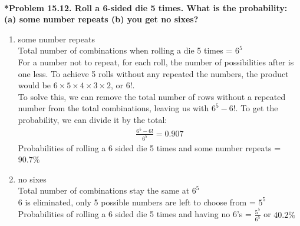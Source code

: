 \documentclass{article}
\begin{document}
    \noindent\\[0.25in]
    \noindent\textbf{*Problem 15.12. Roll a 6-sided die 5 times. What is the probability: (a) some number repeats (b) you get no sixes?}
    \begin{enumerate}[label=(\alph*)]
        \item some number repeats
        \\ Total number of combinations when rolling a die 5 times = $6^5$
        \\ For a number not to repeat, for each roll, the number of possibilities after is one less. To achieve 5 rolls without any repeated the numbers, the product would be $6 \times 5 \times 4 \times 3 \times 2$, or $6!$.
        \\ To solve this, we can remove the total number of rows without a repeated number from the total combinations, leaving us with $6^5 - 6!$. To get the probability, we can divide it by the total:
        \begin{align*}
            \frac{6^5 - 6!}{6^5} = 0.907
        \end{align*}
        Probabilities of rolling a 6 sided die 5 times and some number repeats = {\LARGE $\boxed{\mathbf{90.7\%}}$}
        
        \item no sixes
        \\ Total number of combinations stay the same at $6^5$
        \\ 6 is eliminated, only 5 possible numbers are left to choose from = $5^5$
        \\ Probabilities of rolling a 6 sided die 5 times and having no 6's = {\large $\frac{5^5}{6^5}$} or {\LARGE $\boxed{\mathbf{40.2\%}}$}
    \end{enumerate}
\end{document}
